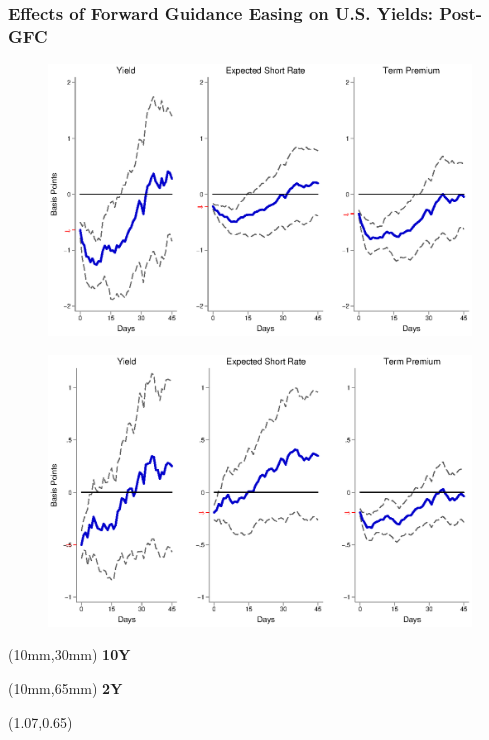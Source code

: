 \documentclass[12pt, aspectratio=169, xcolor=dvipsnames]{beamer}
\begin{document}
\begin{frame}[label=FGUSpost]
\frametitle{Effects of Forward Guidance Easing on U.S. Yields: Post-GFC}
\begin{figure}[!htbp]
\begin{center} %
\includegraphics[trim={0cm 0cm 0cm 0cm},clip,height=0.45\textheight,width=0.85\linewidth]{../Figures/LPs/LagDep-FX/Path/US/PathUSDnomyptp120mPost.eps}
\par\end{center}
\end{figure}
\vspace{-0.5cm}
\begin{figure}[!htbp]
\begin{center} %
\includegraphics[trim={0cm 0cm 0cm 0.76cm},clip,height=0.45\textheight,width=0.85\linewidth]{../Figures/LPs/LagDep-FX/Path/US/PathUSDnomyptp24mPost.eps}
\par\end{center}
\end{figure}
\begin{textblock*}{8mm}(10mm,30mm)
\small \textbf{10Y}
\end{textblock*}
\begin{textblock*}{8mm}(10mm,65mm)
\small \textbf{2Y}
\end{textblock*}
\begin{textblock*}{5cm}(1.07\textwidth,0.65\textheight)
\hyperlink{FGEMpost}{}
\end{textblock*}
\end{frame}
\end{document}
